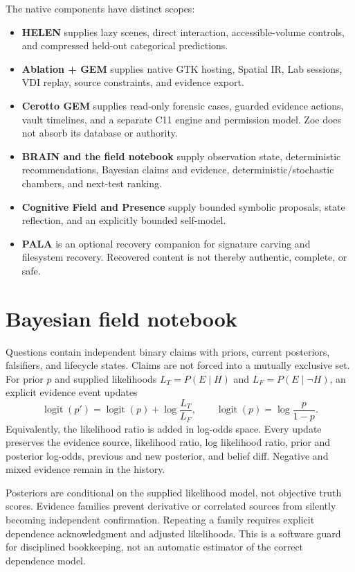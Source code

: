 The native components have distinct scopes:
\begin{itemize}
  \item \textbf{HELEN} supplies lazy scenes, direct interaction, accessible-volume controls, and compressed held-out categorical predictions.
  \item \textbf{Ablation + GEM} supplies native GTK hosting, Spatial IR, Lab sessions, VDI replay, source constraints, and evidence export.
  \item \textbf{Cerotto GEM} supplies read-only forensic cases, guarded evidence actions, vault timelines, and a separate C11 engine and permission model. Zoe does not absorb its database or authority.
  \item \textbf{BRAIN and the field notebook} supply observation state, deterministic recommendations, Bayesian claims and evidence, deterministic/stochastic chambers, and next-test ranking.
  \item \textbf{Cognitive Field and Presence} supply bounded symbolic proposals, state reflection, and an explicitly bounded self-model.
  \item \textbf{PALA} is an optional recovery companion for signature carving and filesystem recovery. Recovered content is not thereby authentic, complete, or safe.
\end{itemize}

\section{Bayesian field notebook}
Questions contain independent binary claims with priors, current posteriors, falsifiers, and lifecycle states. Claims are not forced into a mutually exclusive set. For prior $p$ and supplied likelihoods $L_T=P(E\mid H)$ and $L_F=P(E\mid\neg H)$, an explicit evidence event updates
\begin{equation}
\operatorname{logit}(p')=\operatorname{logit}(p)+\log\frac{L_T}{L_F},
\qquad
\operatorname{logit}(p)=\log\frac{p}{1-p}.
\label{eq:bayes-logit}
\end{equation}
Equivalently, the likelihood ratio is added in log-odds space. Every update preserves the evidence source, likelihood ratio, log likelihood ratio, prior and posterior log-odds, previous and new posterior, and belief diff. Negative and mixed evidence remain in the history.

Posteriors are conditional on the supplied likelihood model, not objective truth scores. Evidence families prevent derivative or correlated sources from silently becoming independent confirmation. Repeating a family requires explicit dependence acknowledgment and adjusted likelihoods. This is a software guard for disciplined bookkeeping, not an automatic estimator of the correct dependence model.

